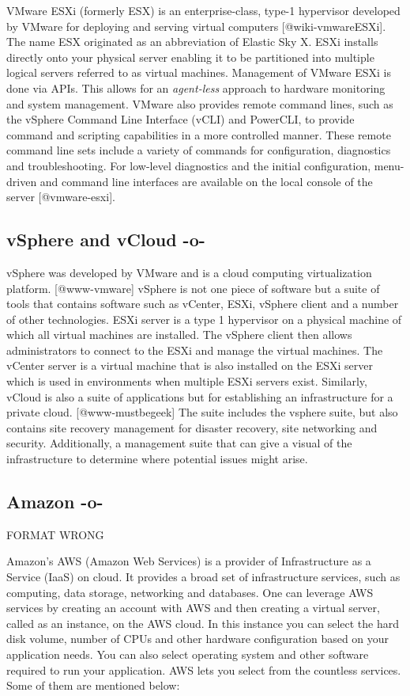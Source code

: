 VMware ESXi (formerly ESX) is an enterprise-class, type-1 hypervisor
developed by VMware for deploying and serving virtual
computers [@wiki-vmwareESXi]. The name ESX originated as an
abbreviation of Elastic Sky X. ESXi installs directly onto your
physical server enabling it to be partitioned into multiple logical
servers referred to as virtual machines.  Management of VMware ESXi is
done via APIs. This allows for an \textit{agent-less} approach to
hardware monitoring and system management. VMware also provides remote
command lines, such as the vSphere Command Line Interface (vCLI) and
PowerCLI, to provide command and scripting capabilities in a more
controlled manner. These remote command line sets include a variety of
commands for configuration, diagnostics and troubleshooting. For
low-level diagnostics and the initial configuration, menu-driven and
command line interfaces are available on the local console of the
server [@vmware-esxi].
     
     
\subsection{vSphere and vCloud -o-}

vSphere was developed by VMware and is a cloud computing
virtualization platform. [@www-vmware] vSphere is not one piece of
software but a suite of tools that contains software such as vCenter,
ESXi, vSphere client and a number of other technologies.  ESXi server
is a type 1 hypervisor on a physical machine of which all virtual
machines are installed.  The vSphere client then allows administrators
to connect to the ESXi and manage the virtual machines.  The vCenter
server is a virtual machine that is also installed on the ESXi server
which is used in environments when multiple ESXi servers exist.
Similarly, vCloud is also a suite of applications but for establishing
an infrastructure for a private cloud. [@www-mustbegeek] The suite
includes the vsphere suite, but also contains site recovery management
for disaster recovery, site networking and security.  Additionally, a
management suite that can give a visual of the infrastructure to
determine where potential issues might arise.
     
\subsection{Amazon -o-}

FORMAT WRONG

Amazon's AWS (Amazon Web Services) is a provider of Infrastructure as
a Service (IaaS) on cloud. It provides a broad set of infrastructure
services, such as computing, data storage, networking and databases.
One can leverage AWS services by creating an account with AWS and then
creating a virtual server, called as an instance, on the AWS cloud.
In this instance you can select the hard disk volume, number of CPUs
and other hardware configuration based on your application needs.  You
can also select operating system and other software required to run
your application. AWS lets you select from the countless services.
Some of them are mentioned below:

